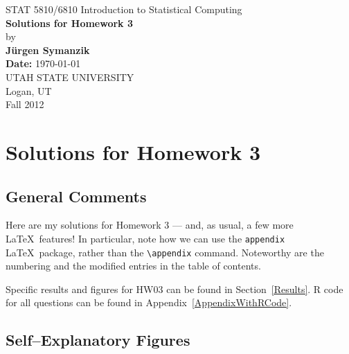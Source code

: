 \documentclass[12pt]{article}
\begin{document}
\begin{titlepage}

\begin{center}
{\large STAT 5810/6810 Introduction to Statistical Computing} \\[4cm]

{\LARGE \bf Solutions for Homework  3} \\[1cm]
by \\[0.5cm]
{\bf J\"urgen Symanzik} \\[2.5cm]
{\bf Date:} \today \\[2cm]

UTAH STATE UNIVERSITY \\[0.5cm]
Logan, UT \\[0.5cm]
Fall 2012 \\[0.5cm]
\end{center}

\thispagestyle{empty}
\vfill
\end{titlepage}


\newpage 



\tableofcontents


\newpage


%

\listoffigures
{}

\newpage 




\section{Solutions for Homework 3}

\subsection{General Comments}

Here are my solutions for Homework 3 --- and, as usual, a few more \LaTeX\ features! 
In particular, note how we can use the {\tt appendix} \LaTeX\ package, rather than
the \verb|\appendix| command. Noteworthy are the numbering and the modified
entries in the table of contents.

Specific results and figures for HW03 can be found in Section~\ref{Results}.
R code for all questions can be found in Appendix~\ref{AppendixWithRCode}.


\subsection{Self--Explanatory Figures}
\end{document}
